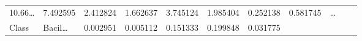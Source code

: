 \documentclass[
]{article}
\begin{document}
\begin{longtable}[]{@{}lllllllllll@{}}
\begin{minipage}[t]{0.09\columnwidth}
10.66\ldots{}\strut
\end{minipage} & \begin{minipage}[t]{0.06\columnwidth}\raggedright
7.492595\strut
\end{minipage} & \begin{minipage}[t]{0.09\columnwidth}\raggedright
2.412824\strut
\end{minipage} & \begin{minipage}[t]{0.06\columnwidth}\raggedright
1.662637\strut
\end{minipage} & \begin{minipage}[t]{0.09\columnwidth}\raggedright
3.745124\strut
\end{minipage} & \begin{minipage}[t]{0.06\columnwidth}\raggedright
1.985404\strut
\end{minipage} & \begin{minipage}[t]{0.06\columnwidth}\raggedright
0.252138\strut
\end{minipage} & \begin{minipage}[t]{0.06\columnwidth}\raggedright
0.581745\strut
\end{minipage} & \begin{minipage}[t]{0.03\columnwidth}\raggedright
\ldots{}\strut
\end{minipage}\tabularnewline
\begin{minipage}[t]{0.06\columnwidth}\raggedright
Class\strut
\end{minipage} & \begin{minipage}[t]{0.06\columnwidth}\raggedright
Bacil\ldots{}\strut
\end{minipage} & \begin{minipage}[t]{0.09\columnwidth}\raggedright
0.002951\strut
\end{minipage} & \begin{minipage}[t]{0.06\columnwidth}\raggedright
0.005112\strut
\end{minipage} & \begin{minipage}[t]{0.09\columnwidth}\raggedright
0.151333\strut
\end{minipage} & \begin{minipage}[t]{0.06\columnwidth}\raggedright
0.199848\strut
\end{minipage} & \begin{minipage}[t]{0.09\columnwidth}\raggedright
0.031775\strut
\end{minipage} & \begin{minipage}[t]{0.06\columnwidth}\raggedright

\end{minipage}
\end{longtable}
\end{document}
